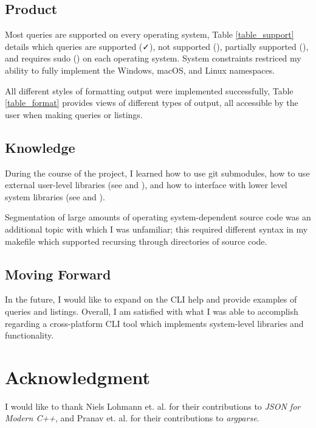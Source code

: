\documentclass[conference]{IEEEtran}
\begin{document}
\subsection{Product}
Most queries are supported on every operating system, Table \ref{table_support} details which queries are
supported (\faCheck), not supported (\faTimes), partially supported (\faPlus), and requires sudo (\faMinus)
on each operating system.
System constraints restriced my ability to fully implement the Windows, macOS, and Linux namespaces.

All different styles of formatting output were implemented successfully, Table \ref{table_format} provides
views of different types of output, all accessible by the user when making queries or listings.

\subsection{Knowledge}
During the course of the project, I learned how to use git submodules, how to use external user-level libraries (see \cite{lohmann:json} and \cite{pranav:argparse}),
and how to interface with lower level system libraries (see \cite{whims:wmi} and \cite{dicanio:winreg}).

Segmentation of large amounts of operating system-dependent source code was an additional topic with which I was unfamiliar;
this required different syntax in my makefile which supported recursing through directories of source code.

\subsection{Moving Forward}
In the future, I would like to expand on the CLI help and provide examples of queries and listings.
Overall, I am satisfied with what I was able to accomplish regarding a cross-platform CLI tool
which implements system-level libraries and functionality.

\section*{Acknowledgment}

I would like to thank Niels Lohmann et. al. for their contributions to \textit{JSON for Modern C++},
and Pranav et. al. for their contributions to \textit{argparse}.

\newpage
\end{document}
